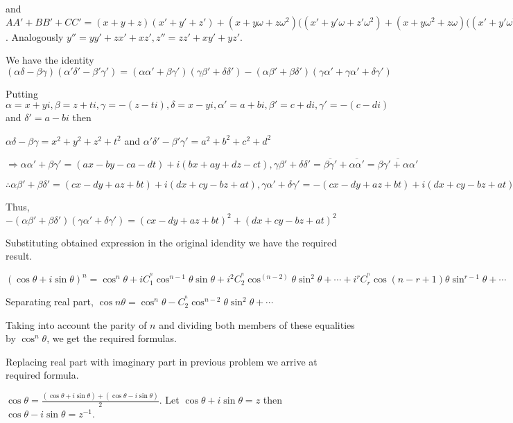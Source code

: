   and $AA' + BB' + CC' = (x + y + z)(x' + y' + z') + (x + y\omega + z\omega^2)((x' + y'\omega + z'\omega^2)
  + (x + y\omega^2 + z\omega)((x' + y'\omega^2 + z'\omega) = 3(xx' + zy' + yz')$. Analogously $y'' = yy' +
  zx' + xz', z'' = zz' + xy' + yz'$.
\item We have the identity $(\alpha\delta - \beta\gamma)(\alpha'\delta' - \beta'\gamma') = (\alpha\alpha' +
  \beta\gamma')(\gamma\beta' + \delta\delta') - (\alpha\beta' + \beta\delta')(\gamma\alpha' + \gamma\alpha'
  + \delta\gamma')$

  Putting $\alpha = x + yi, \beta = z + ti, \gamma = -(z - ti), \delta = x - yi, \alpha' = a + bi, \beta' =
  c + di, \gamma' = -(c - di)$ and $\delta' = a - bi$ then

  $\alpha\delta - \beta\gamma = x^2 + y^2 + z^2 + t^2$ and $\alpha'\delta' - \beta'\gamma' = a^2 + b^2 + c^2
  + d^2$

  $\Rightarrow \alpha\alpha' + \beta\gamma' = (ax - by - ca - dt) + i(bx + ay + dz - ct), \gamma\beta' +
  \delta\delta' = \overline{\beta\gamma'} + \overline{\alpha\alpha'} = \overline{\beta\gamma' +
    \alpha\alpha'}$

  $\therefore \alpha\beta' + \beta\delta' = (cx - dy + az + bt) + i(dx + cy - bz + at), \gamma\alpha' +
  \delta\gamma' = -(cx - dy + az + bt) + i(dx + cy - bz + at)$

  Thus, $-(\alpha\beta' + \beta\delta')(\gamma\alpha' + \delta\gamma') = (cx - dy + az + bt)^2 + (dx + cy -
  bz + at)^2$

  Substituting obtained expression in the original idendity we have the required result.
\item $(\cos\theta + i\sin\theta)^n = \cos^n\theta + iC_1^^n\cos^{n - 1}\theta\sin\theta +
  i^2C_2^^n\cos^{(n - 2)}\theta\sin^2\theta + \cdots + i^rC_r^^n\cos{(n - r + 1)}\theta\sin^{r - 1}\theta +
  \cdots$

  Separating real part, $\cos n\theta = \cos^n\theta - C_2^^n\cos^{n - 2}\theta\sin^2\theta +
  \cdots$

  Taking into account the parity of $n$ and dividing both members of these equalities by $\cos^n\theta$, we
  get the required formulas.
\item Replacing real part with imaginary part in previous problem we arrive at required formula.
\item $\cos\theta = \frac{(\cos\theta + i\sin\theta) + (\cos\theta - i\sin\theta)}{2}$. Let $\cos\theta
  + i\sin\theta = z$ then $\cos\theta - i\sin\theta = z^{-1} $.

